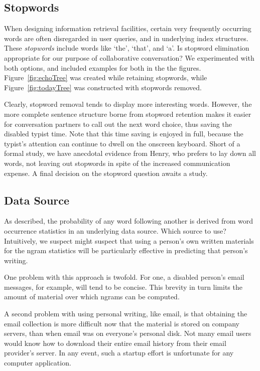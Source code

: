 \documentclass{sigchi}
\begin{document}
\subsection{Stopwords}

When designing information retrieval facilities, certain very
frequently occurring words are often disregarded in user queries, and
in underlying index structures. These {\em stopwords} include words
like `the', `that', and `a'. Is stopword elimination appropriate for
our purpose of collaborative conversation? We experimented with both
options, and included examples for both in the the
figures. Figure~\ref{fig:echoTree} was created while retaining
stopwords, while Figure~\ref{fig:todayTree} was constructed with
stopwords removed. 

Clearly, stopword removal tends to display more interesting
words. However, the more complete sentence structure borne from
stopword retention makes it easier for conversation partners to call
out the next word choice, thus saving the disabled typist time. Note
that this time saving is enjoyed in full, because the typist's
attention can continue to dwell on the onscreen keyboard. Short of a
formal study, we have anecdotal evidence from Henry, who prefers to
lay down all words, not leaving out stopwords in spite of the
increased communication expense. A final decision on the stopword
question awaits a study.

\subsection{Data Source}

As described, the probability of any word following another is derived
from word occurrence statistics in an underlying data source. Which
source to use? Intuitively, we suspect might suspect that using a
person's own written materials for the ngram statistics will be
particularly effective in predicting that person's writing. 

One problem with this approach is twofold. For one, a disabled
person's email messages, for example, will tend to be concise. This
brevity in turn limits the amount of material over which ngrams can be
computed. 

A second problem with using personal writing, like email, is that
obtaining the email collection is more difficult now that the material
is stored on company servers, than when email was on everyone's
personal disk. Not many email users would know how to download their
entire email history from their email provider's server. In any event,
such a startup effort is unfortunate for any computer application.
\end{document}
